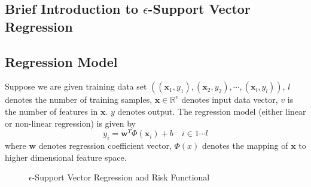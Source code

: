 \documentclass[12pt, draftclsnofoot, onecolumn]{IEEEtran}
\begin{document}
\begin{spacing}{2}



\section{Brief Introduction to $\epsilon$-Support Vector Regression}\label{Introduce epsilon SVR}
\subsection{Regression Model}
Suppose we are given training data set $((\mathbf{x}_{1}, y_{1}),(\mathbf{x}_{2},y_{2}),\cdots,(\mathbf{x}_{l},y_{l}))$, $l$ denotes the number of training samples, $\mathbf{x}\in \mathbb{R}^{v}$ denotes input data vector, $v$ is the number of features in $\mathbf{x}$. $y$ denotes output. The regression model (either linear or non-linear regression) is given by 
\begin{equation}
y_{i}=\mathbf{w}^{T}\Phi(\mathbf{x}_{i})+b  \quad i\in 1\cdots l 
\label{equation1}
\end{equation} 
where $\mathbf{w}$ denotes regression coefficient vector, $\Phi(x)$ denotes the mapping of $\mathbf{\mathbf{x}}$ to higher dimensional feature space.

\begin{figure}
\centering
\def\svgwidth{\columnwidth}

\caption{$\epsilon$-Support Vector Regression and Risk Functional}
\label{epsilon-SVR}
\end{figure}


\end{spacing}
\end{document}
